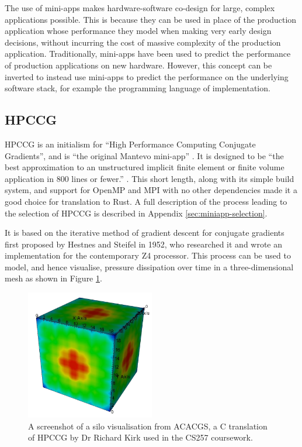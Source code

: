 The use of mini-apps makes hardware-software co-design for large, complex applications possible. This is because they can be used in place of the production application whose performance they model when making very early design decisions, without incurring the cost of massive complexity of the production application. Traditionally, mini-apps have been used to predict the performance of production applications on new hardware. However, this concept can be inverted to instead use mini-apps to predict the performance on the underlying software stack, for example the programming language of implementation.


\subsection{HPCCG}
\label{ssec:hpccg} %

HPCCG is an initialism for ``High Performance Computing Conjugate Gradients'', and is ``the original Mantevo mini-app'' \cite{herouxHPCCGSolverPackage2007}. It is designed to be ``the best approximation to an unstructured implicit finite element or finite volume application in 800 lines or fewer.'' \cite{PackagesMantevo}. This short length, along with its simple build system, and support for OpenMP and MPI with no other dependencies made it a good choice for translation to Rust. A full description of the process leading to the selection of HPCCG is described in Appendix \ref{sec:miniapp-selection}.

It is based on the iterative method of gradient descent for conjugate gradients first proposed by Hestnes and Steifel in 1952\cite{hestenesMethodsConjugateGradients1952}, who researched it and wrote an implementation for the contemporary Z4 processor. This process can be used to model, and hence visualise, pressure dissipation over time in a three-dimensional mesh as shown in Figure \ref{fig:acacgs_silo_output}.

\begin{figure}[H]
    \centering
    \includegraphics[width=0.5\textwidth]{images/2_background/acacgs_silo_output.png}
    \caption{A screenshot of a silo visualisation from ACACGS, a C translation of HPCCG by Dr Richard Kirk used in the CS257 coursework.}
    \label{fig:acacgs_silo_output}
\end{figure}

